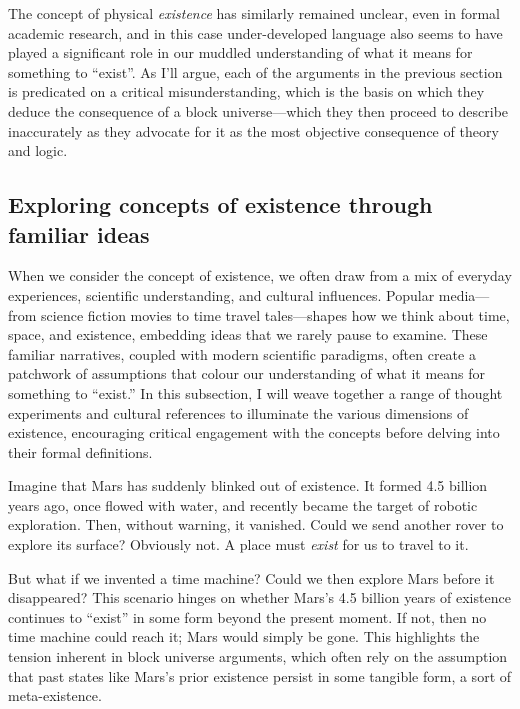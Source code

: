 \documentclass[aps,rmp,groupedaddress,twocolumn,10pt]{revtex4-2}
\begin{document}
The concept of physical \textit{existence} has similarly remained unclear, even in formal academic research, and in this case under-developed language also seems to have played a significant role in our muddled understanding of what it means for something to ``exist''. As I'll argue, each of the arguments in the previous section is predicated on a critical misunderstanding, which is the basis on which they deduce the consequence of a block universe---which they then proceed to describe inaccurately as they advocate for it as the most objective consequence of theory and logic.

\subsection{Exploring concepts of existence through familiar ideas}

When we consider the concept of existence, we often draw from a mix of everyday experiences, scientific understanding, and cultural influences. Popular media---from science fiction movies to time travel tales---shapes how we think about time, space, and existence, embedding ideas that we rarely pause to examine. These familiar narratives, coupled with modern scientific paradigms, often create a patchwork of assumptions that colour our understanding of what it means for something to ``exist.'' In this subsection, I will weave together a range of thought experiments and cultural references to illuminate the various dimensions of existence, encouraging critical engagement with the concepts before delving into their formal definitions.

Imagine that Mars has suddenly blinked out of existence. It formed 4.5 billion years ago, once flowed with water, and recently became the target of robotic exploration. Then, without warning, it vanished. Could we send another rover to explore its surface? Obviously not. A place must \textit{exist} for us to travel to it. 

But what if we invented a time machine? Could we then explore Mars before it disappeared? This scenario hinges on whether Mars's 4.5 billion years of existence continues to ``exist'' in some form beyond the present moment. If not, then no time machine could reach it; Mars would simply be gone. This highlights the tension inherent in block universe arguments, which often rely on the assumption that past states like Mars's prior existence persist in some tangible form, a sort of meta-existence.
\end{document}
